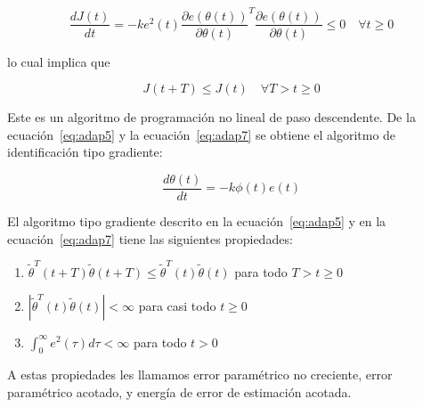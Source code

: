             \begin{equation*}
                \frac{d J(t)}{dt} = -k e^2(t) \frac{\partial e(\theta(t))}{\partial \theta(t)}^T \frac{\partial e(\theta(t))}{\partial \theta(t)} \le 0 \quad \forall t \ge 0
            \end{equation*}

            lo cual implica que

            \begin{equation}
                J(t + T) \le J(t) \quad \forall T > t \ge 0
            \end{equation}

            Este es un algoritmo de programación no lineal de paso descendente.
            De la ecuación~\ref{eq:adap5} y la ecuación~\ref{eq:adap7} se obtiene el algoritmo de identificación tipo gradiente:

            \begin{equation} \label{eq:adap7}
                \frac{d \theta(t)}{dt} = -k \phi(t)e(t)
            \end{equation}


            \begin{lema}
                El algoritmo tipo gradiente descrito en la ecuación~\ref{eq:adap5} y en la ecuación~\ref{eq:adap7} tiene las siguientes propiedades:

                \begin{enumerate}
                    \item $\tilde{\theta}^T(t + T) \tilde{\theta}(t + T) \le \tilde{\theta}^T(t) \tilde{\theta}(t)$ para todo $T > t \ge 0$
                    \item $\left| \tilde{\theta}^T(t) \tilde{\theta}(t) \right| < \infty$ para casi todo $t \ge 0$
                    \item $\int_0^{\infty} e^2(\tau) d\tau < \infty$ para todo $t > 0$
                \end{enumerate}

                A estas propiedades les llamamos error paramétrico no creciente, error paramétrico acotado, y energía de error de estimación acotada.
            \end{lema}

